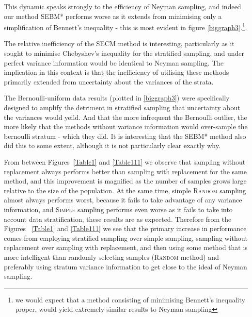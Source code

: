 

This dynamic speaks strongly to the efficiency of Neyman sampling, and indeed our method SEBM* performs worse as it extends from minimising only a simplification of Bennett's inequality - this is most evident in figure \ref{biggraph3}.\footnote{we would expect that a method consisting of minimising Bennett's inequality proper, would yield extremely similar results to Neyman sampling}.

The relative inefficiency of the SECM method is interesting, particularly as it sought to minimise Chebyshev's inequality for the stratified sampling, and under perfect variance information would be identical to Neyman sampling.
The implication in this context is that the inefficiency of utilising these methods primarily extended from uncertainty about the variances of the strata.

The Bernoulli-uniform data results (plotted in \ref{biggraph3}) were specifically designed to amplify the detriment in stratified sampling that uncertainty about the variances would yeild.
And that the more infrequent the Bernoulli outlier, the more likely that the methods without variance information would over-sample the bernoulli stratum - which they did.
It is interesting that the SEBM* method also did this to some extent, although it is not particularly clear exactly why.


From between Figures~\ref{Table1} and \ref{Table111} we observe that sampling without replacement always performs better than sampling with replacement for the same method, and this improvement is magnified as the number of samples grows large relative to the size of the population. 
At the same time, simple \textsc{Random} sampling almost always performs worst, because it fails to take advantage of any variance information, and \textsc{Simple} sampling performs even worse as it fails to take into account data stratification, these results are as expected.
Therefore from the Figures ~\ref{Table1} and \ref{Table111} we see that the primary increase in performance comes from employing stratified sampling over simple sampling, sampling without replacement over sampling with replacement, and then using some method that is more intelligent than randomly selecting samples (\textsc{Random} method) and preferably using stratum variance information to get close to the ideal of Neyman sampling.

